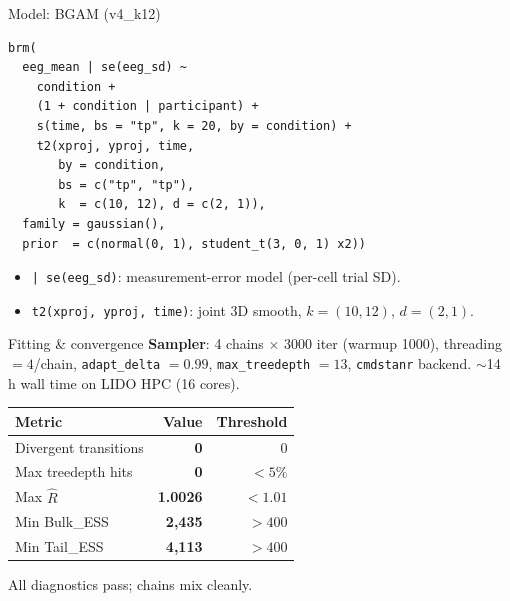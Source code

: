 \documentclass[10pt,aspectratio=169]{beamer}
\begin{document}
\begin{frame}[fragile]{Model: BGAM (v4\_k12)}
\begin{lstlisting}
brm(
  eeg_mean | se(eeg_sd) ~
    condition +
    (1 + condition | participant) +
    s(time, bs = "tp", k = 20, by = condition) +
    t2(xproj, yproj, time,
       by = condition,
       bs = c("tp", "tp"),
       k  = c(10, 12), d = c(2, 1)),
  family = gaussian(),
  prior  = c(normal(0, 1), student_t(3, 0, 1) x2))
\end{lstlisting}

  \vspace{0.3em}
  \begin{itemize}
    \item \texttt{| se(eeg\_sd)}: measurement-error model
          (per-cell trial SD).
    \item \texttt{t2(xproj, yproj, time)}:
          joint 3D smooth, $k = (10,12)$, $d = (2,1)$.
  \end{itemize}
\end{frame}

\begin{frame}{Fitting \& convergence}
  \textbf{Sampler}: 4 chains $\times$ 3000 iter (warmup 1000),
  threading $= 4$/chain, \texttt{adapt\_delta} $= 0.99$,
  \texttt{max\_treedepth} $= 13$, \texttt{cmdstanr} backend.
  $\sim$14 h wall time on LIDO HPC (16 cores).

  \vspace{0.6em}
  \begin{center}
  \begin{tabular}{lrr}
    \toprule
    Metric                & Value           & Threshold \\
    \midrule
    Divergent transitions & \textbf{0}      & 0          \\
    Max treedepth hits    & \textbf{0}      & $< 5\%$    \\
    Max $\hat{R}$         & \textbf{1.0026} & $< 1.01$   \\
    Min Bulk\_ESS         & \textbf{2{,}435} & $> 400$   \\
    Min Tail\_ESS         & \textbf{4{,}113} & $> 400$   \\
    \bottomrule
  \end{tabular}
  \end{center}

  \vspace{0.5em}
  All diagnostics pass; chains mix cleanly.
\end{frame}
\end{document}
